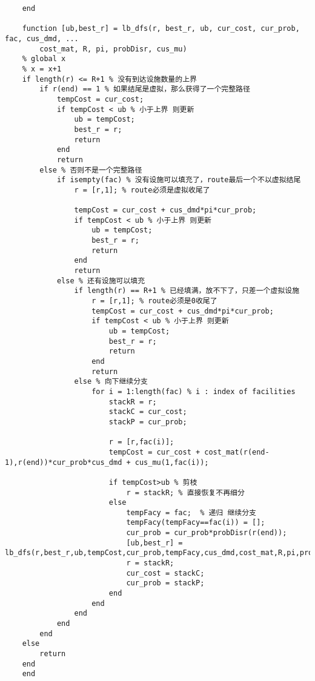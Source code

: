 {\begin{lstlisting}
    end

    function [ub,best_r] = lb_dfs(r, best_r, ub, cur_cost, cur_prob, fac, cus_dmd, ...
        cost_mat, R, pi, probDisr, cus_mu)
    % global x
    % x = x+1
    if length(r) <= R+1 % 没有到达设施数量的上界
        if r(end) == 1 % 如果结尾是虚拟，那么获得了一个完整路径
            tempCost = cur_cost;
            if tempCost < ub % 小于上界 则更新
                ub = tempCost;
                best_r = r;
                return
            end
            return
        else % 否则不是一个完整路径
            if isempty(fac) % 没有设施可以填充了，route最后一个不以虚拟结尾
                r = [r,1]; % route必须是虚拟收尾了

                tempCost = cur_cost + cus_dmd*pi*cur_prob;
                if tempCost < ub % 小于上界 则更新
                    ub = tempCost;
                    best_r = r;
                    return
                end
                return
            else % 还有设施可以填充
                if length(r) == R+1 % 已经填满，放不下了，只差一个虚拟设施
                    r = [r,1]; % route必须是0收尾了
                    tempCost = cur_cost + cus_dmd*pi*cur_prob;
                    if tempCost < ub % 小于上界 则更新
                        ub = tempCost;
                        best_r = r;
                        return
                    end
                    return
                else % 向下继续分支
                    for i = 1:length(fac) % i : index of facilities
                        stackR = r;
                        stackC = cur_cost;
                        stackP = cur_prob;

                        r = [r,fac(i)];
                        tempCost = cur_cost + cost_mat(r(end-1),r(end))*cur_prob*cus_dmd + cus_mu(1,fac(i));

                        if tempCost>ub % 剪枝
                            r = stackR; % 直接恢复不再细分
                        else
                            tempFacy = fac;  % 递归 继续分支
                            tempFacy(tempFacy==fac(i)) = [];
                            cur_prob = cur_prob*probDisr(r(end));
                            [ub,best_r] = lb_dfs(r,best_r,ub,tempCost,cur_prob,tempFacy,cus_dmd,cost_mat,R,pi,probDisr,cus_mu);
                            r = stackR;
                            cur_cost = stackC;
                            cur_prob = stackP;
                        end
                    end
                end
            end
        end
    else
        return
    end
    end
    

\end{lstlisting}}
